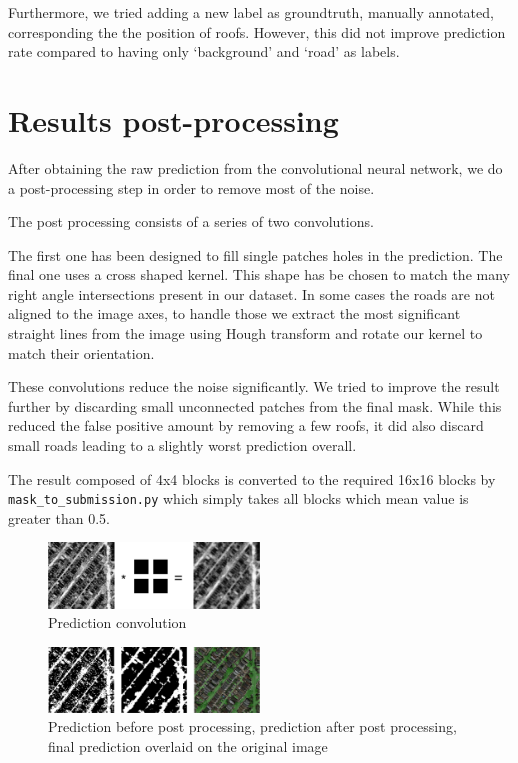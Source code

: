 \documentclass[11pt,conference,compsocconf]{IEEEtran}
\begin{document}
Furthermore, we tried adding a new label as groundtruth, manually annotated, corresponding the the position of roofs. However, this did not improve prediction rate compared to having only `background' and `road' as labels.


\section{Results post-processing}
After obtaining the raw prediction from the convolutional neural network, we do a post-processing step in order to remove most of the noise.

The post processing consists of a series of two convolutions.

The first one has been designed to fill single patches holes in the prediction.
The final one uses a cross shaped kernel. This shape has be chosen to match the many right angle intersections present in our dataset.
In some cases the roads are not aligned to the image axes, to handle those we extract the most significant straight lines from the image using Hough transform and rotate our kernel to match their orientation.

These convolutions reduce the noise significantly. We tried to improve the result further by discarding small unconnected patches from the final mask. While this reduced the false positive amount by removing  a few roofs, it did also discard small roads leading to a slightly worst prediction overall.

The result composed of 4x4 blocks is converted to the required 16x16 blocks by \texttt{mask\_to\_submission.py} which simply takes all blocks which mean value is greater than 0.5.

\begin{figure}[h]
\includegraphics[width=0.5\textwidth]{conv.png}
\caption{Prediction convolution}
\end{figure}

\begin{figure}[h]
\includegraphics[width=0.5\textwidth]{final.png}
\caption{Prediction before post processing, prediction after post processing, final prediction overlaid on the original image}
\end{figure}
\end{document}

